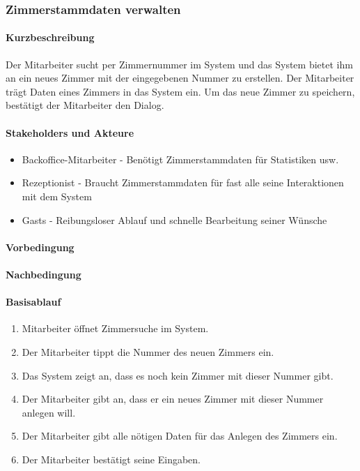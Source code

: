 \subsubsection{Zimmerstammdaten verwalten}

\paragraph{Kurzbeschreibung}
Der \Gls{Mitarbeiter} sucht per \Gls{Zimmernummer} im System und das System bietet ihm an ein neues \Gls{Zimmer} mit der eingegebenen Nummer zu erstellen. Der \Gls{Mitarbeiter} trägt Daten eines \Gls{Zimmer}s in das System ein. Um das neue \Gls{Zimmer} zu speichern, bestätigt der \Gls{Mitarbeiter} den Dialog.

\paragraph{Stakeholders und Akteure}
\begin{itemize}
	\item \Gls{Backoffice}-\Gls{Mitarbeiter} - Benötigt Zimmerstammdaten für Statistiken usw.
	\item \Gls{Rezeptionist} - Braucht Zimmerstammdaten für fast alle seine Interaktionen mit dem System
	\item \Glspl{Gast} - Reibungsloser Ablauf und schnelle Bearbeitung seiner Wünsche
\end{itemize}

\paragraph{Vorbedingung}


\paragraph{Nachbedingung}

\paragraph{Basisablauf}
\begin{enumerate}
	\item \Gls{Mitarbeiter} öffnet Zimmersuche im System.
	\item Der \Gls{Mitarbeiter} tippt die Nummer des neuen \Gls{Zimmer}s ein.
	\item Das System zeigt an, dass es noch kein \Gls{Zimmer} mit dieser Nummer gibt.
	\item Der \Gls{Mitarbeiter} gibt an, dass er ein neues \Gls{Zimmer} mit dieser Nummer anlegen will.
	\item Der \Gls{Mitarbeiter} gibt alle nötigen Daten für das Anlegen des \Gls{Zimmer}s ein.
	\item Der \Gls{Mitarbeiter} bestätigt seine Eingaben.
\end{enumerate}

